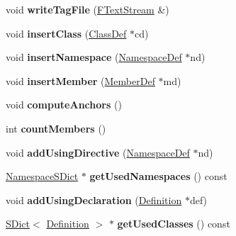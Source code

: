 \begin{DoxyCompactItemize}
\mbox{\label{class_namespace_def_ab49c635f18b0326ea693c2e53565fec5}} 
void {\bfseries write\+Tag\+File} (\mbox{\hyperlink{class_f_text_stream}{F\+Text\+Stream}} \&)
\item 
\mbox{\label{class_namespace_def_a0ef84054d4f877e7d0259cbbdbcc357b}} 
void {\bfseries insert\+Class} (\mbox{\hyperlink{class_class_def}{Class\+Def}} $\ast$cd)
\item 
\mbox{\label{class_namespace_def_ad8541e3f12703c4d15d452d517f766f5}} 
void {\bfseries insert\+Namespace} (\mbox{\hyperlink{class_namespace_def}{Namespace\+Def}} $\ast$nd)
\item 
\mbox{\label{class_namespace_def_a38f5aa9ebc5f6f6bf2b7b74b920644c0}} 
void {\bfseries insert\+Member} (\mbox{\hyperlink{class_member_def}{Member\+Def}} $\ast$md)
\item 
\mbox{\label{class_namespace_def_ae084faa2e838df796c83edb5ed91ccdf}} 
void {\bfseries compute\+Anchors} ()
\item 
\mbox{\label{class_namespace_def_a519a9d379318446771b10218b0a5815f}} 
int {\bfseries count\+Members} ()
\item 
\mbox{\label{class_namespace_def_aa498560251ece9f53560fa01969a2577}} 
void {\bfseries add\+Using\+Directive} (\mbox{\hyperlink{class_namespace_def}{Namespace\+Def}} $\ast$nd)
\item 
\mbox{\label{class_namespace_def_aa687d04ca3f51ed10fa4fdcb697bb743}} 
\mbox{\hyperlink{class_namespace_s_dict}{Namespace\+S\+Dict}} $\ast$ {\bfseries get\+Used\+Namespaces} () const
\item 
\mbox{\label{class_namespace_def_af1db7a8a28a023036b23c56126cf718b}} 
void {\bfseries add\+Using\+Declaration} (\mbox{\hyperlink{class_definition}{Definition}} $\ast$def)
\item 
\mbox{\label{class_namespace_def_ad048a03b36d60c49de501c7247eb3468}} 
\mbox{\hyperlink{class_s_dict}{S\+Dict}}$<$ \mbox{\hyperlink{class_definition}{Definition}} $>$ $\ast$ {\bfseries get\+Used\+Classes} () const

\end{DoxyCompactItemize}
